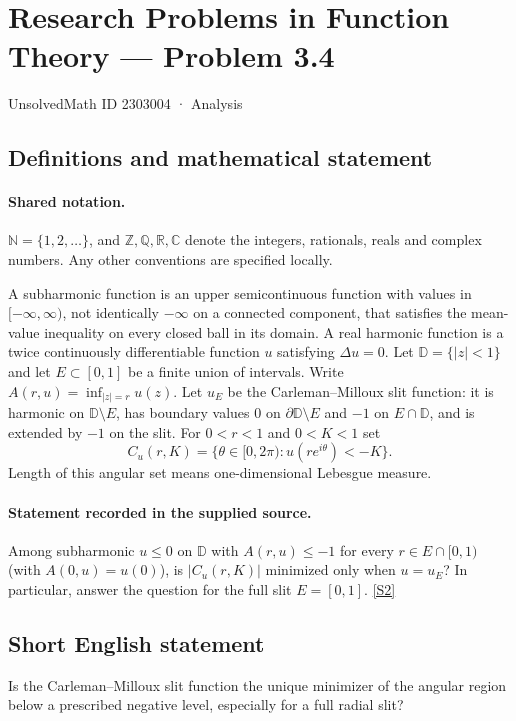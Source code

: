 \documentclass[11pt]{article}
\newcommand{\sref}[2]{\hyperlink{source:#1:#2}{[S#2]}}
\begin{document}
\setcounter{section}{2303003}
\section{Research Problems in Function Theory — Problem 3.4}\label{2303004}
{\small\sffamily UnsolvedMath ID 2303004 · Analysis}
\subsection{Definitions and mathematical statement}

\paragraph{Shared notation.}$\mathbb N=\{1,2,\ldots\}$, and $\mathbb Z,\mathbb Q,\mathbb R,\mathbb C$ denote the integers, rationals, reals and complex numbers. Any other conventions are specified locally.


A subharmonic function is an upper semicontinuous function with values in $[-\infty,\infty)$, not identically $-\infty$ on a connected component, that satisfies the mean-value inequality on every closed ball in its domain. A real harmonic function is a twice continuously differentiable function $u$ satisfying $\Delta u=0$. Let $\mathbb D=\{|z|<1\}$ and let $E\subset[0,1]$ be a finite union of intervals. Write $A(r,u)=\inf_{|z|=r}u(z)$. Let $u_E$ be the Carleman--Milloux slit function: it is harmonic on $\mathbb D\setminus E$, has boundary values $0$ on $\partial\mathbb D\setminus E$ and $-1$ on $E\cap\mathbb D$, and is extended by $-1$ on the slit. For $0<r<1$ and $0<K<1$ set
\[C_u(r,K)=\{\theta\in[0,2\pi):u(re^{i\theta})<-K\}.\]
Length of this angular set means one-dimensional Lebesgue measure.
\paragraph{Statement recorded in the supplied source.}
Among subharmonic $u\leq0$ on $\mathbb D$ with $A(r,u)\leq-1$ for every $r\in E\cap[0,1)$ (with $A(0,u)=u(0)$), is $|C_u(r,K)|$ minimized only when $u=u_E$? In particular, answer the question for the full slit $E=[0,1]$. \sref{2303004}{2}
\subsection{Short English statement}
Is the Carleman--Milloux slit function the unique minimizer of the angular region below a prescribed negative level, especially for a full radial slit?
\end{document}
